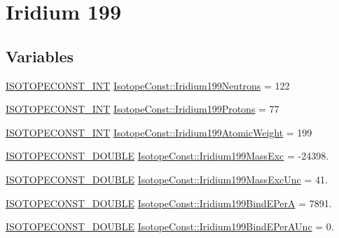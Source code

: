 \hypertarget{group___isotope_const-_iridium-_ir199}{}\section{Iridium 199}
\label{group___isotope_const-_iridium-_ir199}
\subsection*{Variables}
\begin{DoxyCompactItemize}
\item 
\mbox{\hyperlink{group___isotope_const-_macros_ga5f18360b3e99483a35c32d789e62621c}{I\+S\+O\+T\+O\+P\+E\+C\+O\+N\+S\+T\+\_\+\+I\+NT}} \mbox{\hyperlink{group___isotope_const-_iridium-_ir199_ga14737a82a981a79b31c78b66c17c01d9}{Isotope\+Const\+::\+Iridium199\+Neutrons}} = 122
\item 
\mbox{\hyperlink{group___isotope_const-_macros_ga5f18360b3e99483a35c32d789e62621c}{I\+S\+O\+T\+O\+P\+E\+C\+O\+N\+S\+T\+\_\+\+I\+NT}} \mbox{\hyperlink{group___isotope_const-_iridium-_ir199_ga2d82ed4c64fce8fc9a899a26290257cf}{Isotope\+Const\+::\+Iridium199\+Protons}} = 77
\item 
\mbox{\hyperlink{group___isotope_const-_macros_ga5f18360b3e99483a35c32d789e62621c}{I\+S\+O\+T\+O\+P\+E\+C\+O\+N\+S\+T\+\_\+\+I\+NT}} \mbox{\hyperlink{group___isotope_const-_iridium-_ir199_ga4520e95fbcf54c444a397f913e222ef4}{Isotope\+Const\+::\+Iridium199\+Atomic\+Weight}} = 199
\item 
\mbox{\hyperlink{group___isotope_const-_macros_ga8f45a7272ce02c0b4c65c44636ed719a}{I\+S\+O\+T\+O\+P\+E\+C\+O\+N\+S\+T\+\_\+\+D\+O\+U\+B\+LE}} \mbox{\hyperlink{group___isotope_const-_iridium-_ir199_ga21c299c388b0f176ae19970c5bf8e46a}{Isotope\+Const\+::\+Iridium199\+Mass\+Exc}} = -\/24398.
\item 
\mbox{\hyperlink{group___isotope_const-_macros_ga8f45a7272ce02c0b4c65c44636ed719a}{I\+S\+O\+T\+O\+P\+E\+C\+O\+N\+S\+T\+\_\+\+D\+O\+U\+B\+LE}} \mbox{\hyperlink{group___isotope_const-_iridium-_ir199_gaec4e25f6ec85015a58e06fb2fb77c9ed}{Isotope\+Const\+::\+Iridium199\+Mass\+Exc\+Unc}} = 41.
\item 
\mbox{\hyperlink{group___isotope_const-_macros_ga8f45a7272ce02c0b4c65c44636ed719a}{I\+S\+O\+T\+O\+P\+E\+C\+O\+N\+S\+T\+\_\+\+D\+O\+U\+B\+LE}} \mbox{\hyperlink{group___isotope_const-_iridium-_ir199_ga7a72514f671a4ec5dfa1315da45754d7}{Isotope\+Const\+::\+Iridium199\+Bind\+E\+PerA}} = 7891.
\item 
\mbox{\hyperlink{group___isotope_const-_macros_ga8f45a7272ce02c0b4c65c44636ed719a}{I\+S\+O\+T\+O\+P\+E\+C\+O\+N\+S\+T\+\_\+\+D\+O\+U\+B\+LE}} \mbox{\hyperlink{group___isotope_const-_iridium-_ir199_ga9431ffa667056c4e413292a13936ea28}{Isotope\+Const\+::\+Iridium199\+Bind\+E\+Per\+A\+Unc}} = 0.

\end{DoxyCompactItemize}

